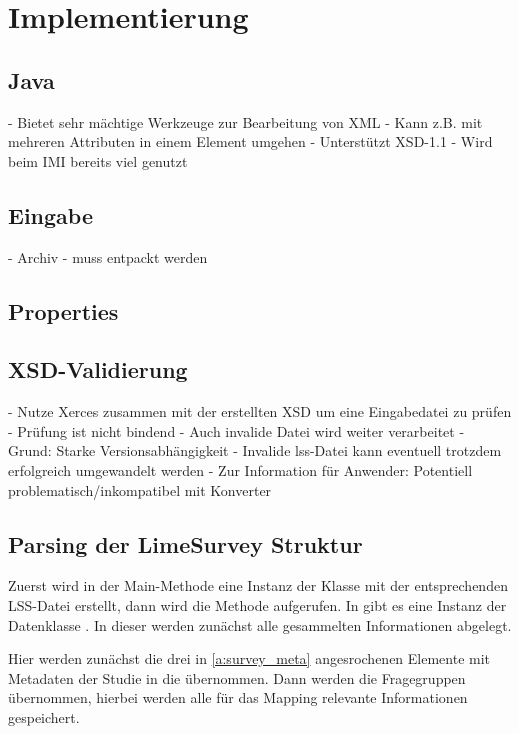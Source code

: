 \section{Implementierung}

\subsection{Java}

- Bietet sehr mächtige Werkzeuge zur Bearbeitung von XML
	- Kann z.B. mit mehreren Attributen in einem Element umgehen
	- Unterstützt XSD-1.1
- Wird beim IMI bereits viel genutzt

\subsection{Eingabe}

- Archiv
	- muss entpackt werden

\subsection{Properties}

\subsection{XSD-Validierung}

- Nutze Xerces zusammen mit der erstellten XSD um eine Eingabedatei zu prüfen
- Prüfung ist nicht bindend
	- Auch invalide Datei wird weiter verarbeitet
	- Grund: Starke Versionsabhängigkeit
		- Invalide lss-Datei kann eventuell trotzdem erfolgreich umgewandelt werden
	- Zur Information für Anwender: Potentiell problematisch/inkompatibel mit Konverter

\subsection{Parsing der LimeSurvey Struktur}

Zuerst wird in der Main-Methode eine Instanz der Klasse  mit der entsprechenden LSS-Datei erstellt, dann wird die Methode  aufgerufen.
In  gibt es eine Instanz der Datenklasse . In dieser werden zunächst alle gesammelten Informationen abgelegt.

Hier werden zunächst die drei in \cref{a:survey_meta} angesrochenen Elemente mit Metadaten der Studie in die  übernommen.
Dann werden die Fragegruppen übernommen, hierbei werden alle für das Mapping relevante Informationen gespeichert.

